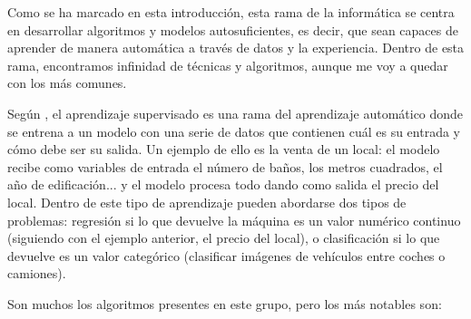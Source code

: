 	Como se ha marcado en esta introducción, esta rama de la informática se centra en desarrollar algoritmos y modelos autosuficientes, es decir, que sean capaces de aprender de manera automática a través de datos y la experiencia. Dentro de esta rama, encontramos infinidad de técnicas y algoritmos, aunque me voy a quedar con los más comunes.
	
	Según \cite{ibm:machine_learning}, el aprendizaje supervisado es una rama del aprendizaje automático donde se entrena a un modelo con una serie de datos que contienen cuál es su entrada y cómo debe ser su salida. Un ejemplo de ello es la venta de un local: el modelo recibe como variables de entrada el número de baños, los metros cuadrados, el año de edificación... y el modelo procesa todo dando como salida el precio del local. Dentro de este tipo de aprendizaje pueden abordarse dos tipos de problemas: regresión si lo que devuelve la máquina es un valor numérico continuo (siguiendo con el ejemplo anterior, el precio del local), o clasificación si lo que devuelve es un valor categórico (clasificar imágenes de vehículos entre coches o camiones).
	
	Son muchos los algoritmos presentes en este grupo, pero los más notables son:
	
